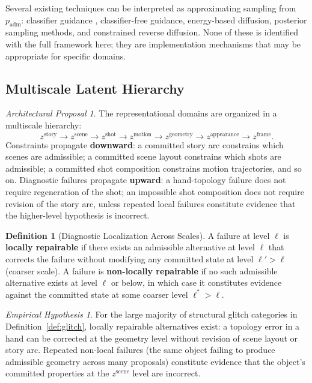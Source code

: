 \documentclass[12pt,a4paper]{article}
\theoremstyle{plain}
\theoremstyle{definition}
\newtheorem{definition}[theorem]{Definition}
\theoremstyle{remark}
\newtheorem{hypothesis}[theorem]{Empirical Hypothesis}
\newtheorem{proposal}[theorem]{Architectural Proposal}
\begin{document}
Several existing techniques can be interpreted as approximating sampling from $p_{\mathrm{adm}}$: classifier guidance \cite{dhariwal2021diffusion}, classifier-free guidance, energy-based diffusion, posterior sampling methods, and constrained reverse diffusion. None of these is identified with the full framework here; they are implementation mechanisms that may be appropriate for specific domains.

\subsection{Multiscale Latent Hierarchy}

\begin{proposal}
The representational domains are organized in a multiscale hierarchy:
\[
z^{\mathrm{story}} \to z^{\mathrm{scene}} \to z^{\mathrm{shot}} \to z^{\mathrm{motion}} \to z^{\mathrm{geometry}} \to z^{\mathrm{appearance}} \to z^{\mathrm{frame}}.
\]
Constraints propagate \textbf{downward}: a committed story arc constrains which scenes are admissible; a committed scene layout constrains which shots are admissible; a committed shot composition constrains motion trajectories, and so on. Diagnostic failures propagate \textbf{upward}: a hand-topology failure does not require regeneration of the shot; an impossible shot composition does not require revision of the story arc, unless repeated local failures constitute evidence that the higher-level hypothesis is incorrect.
\end{proposal}

\begin{definition}[Diagnostic Localization Across Scales]
A failure at level $\ell$ is \textbf{locally repairable} if there exists an admissible alternative at level $\ell$ that corrects the failure without modifying any committed state at level $\ell' > \ell$ (coarser scale). A failure is \textbf{non-locally repairable} if no such admissible alternative exists at level $\ell$ or below, in which case it constitutes evidence against the committed state at some coarser level $\ell^* > \ell$.
\end{definition}

\begin{hypothesis}
\label{hyp:localrepair}
For the large majority of structural glitch categories in Definition~\ref{def:glitch}, locally repairable alternatives exist: a topology error in a hand can be corrected at the geometry level without revision of scene layout or story arc. Repeated non-local failures (the same object failing to produce admissible geometry across many proposals) constitute evidence that the object's committed properties at the $z^{\mathrm{scene}}$ level are incorrect.
\end{hypothesis}
\end{document}

